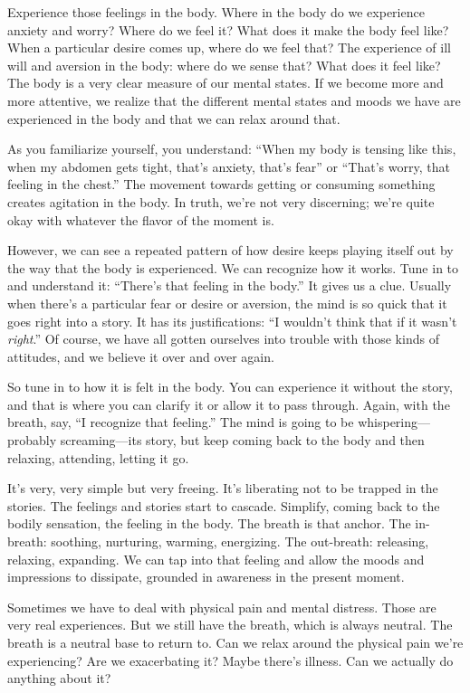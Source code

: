 Experience those feelings in the body. Where in the body do we
experience anxiety and worry? Where do we feel it? What does it make the
body feel like? When a particular desire comes up, where do we feel
that? The experience of ill will and aversion in the body: where do we
sense that? What does it feel like? The body is a very clear measure of
our mental states. If we become more and more attentive, we realize that
the different mental states and moods we have are experienced in the
body and that we can relax around that.

As you familiarize yourself, you understand: “When my body is tensing
like this, when my abdomen gets tight, that’s anxiety, that’s fear” or
“That’s worry, that feeling in the chest.” The movement towards getting
or consuming something creates agitation in the body. In truth, we’re
not very discerning; we’re quite okay with whatever the flavor of the
moment is.

However, we can see a repeated pattern of how desire keeps playing
itself out by the way that the body is experienced. We can recognize how
it works. Tune in to and understand it: “There’s that feeling in the
body.” It gives us a clue. Usually when there’s a particular fear or
desire or aversion, the mind is so quick that it goes right into a
story. It has its justifications: “I wouldn’t think that if it wasn’t
\emph{right}.” Of course, we have all gotten ourselves into trouble with
those kinds of attitudes, and we believe it over and over again.

So tune in to how it is felt in the body. You can experience it without
the story, and that is where you can clarify it or allow it to pass
through. Again, with the breath, say, “I recognize that feeling.” The
mind is going to be whispering—probably screaming—its story, but keep
coming back to the body and then relaxing, attending, letting it go.

It’s very, very simple but very freeing. It’s liberating not to be
trapped in the stories. The feelings and stories start to cascade.
Simplify, coming back to the bodily sensation, the feeling in the body.
The breath is that anchor. The in-breath: soothing, nurturing, warming,
energizing. The out-breath: releasing, relaxing, expanding. We can tap
into that feeling and allow the moods and impressions to dissipate,
grounded in awareness in the present moment.

Sometimes we have to deal with physical pain and mental distress. Those
are very real experiences. But we still have the breath, which is always
neutral. The breath is a neutral base to return to. Can we relax around
the physical pain we’re experiencing? Are we exacerbating it? Maybe
there’s illness. Can we actually do anything about it?

